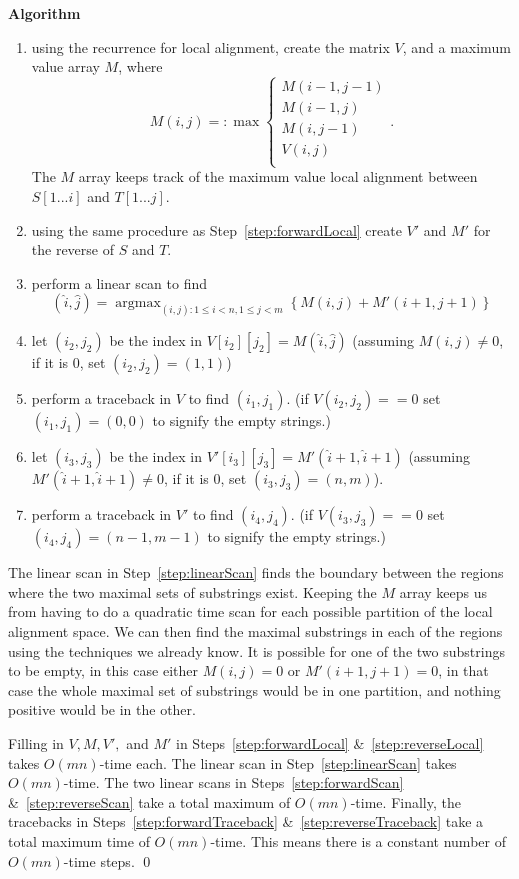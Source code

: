\documentclass[11pt, oneside]{article}   	%
\DeclareMathOperator*{\argmax}{argmax}
\begin{document}
\begin{enumerate}
\textbf{Algorithm}
\begin{enumerate}
\item using the recurrence for local alignment, create the matrix $V$, and a maximum value array $M$, where 
\[
M(i,j) =: \max \begin{cases}
M(i-1,j-1)\\
M(i-1,j)\\
M(i,j-1)\\
V(i,j)\\
\end{cases}.
\]
The $M$ array keeps track of the maximum value local alignment between $S[1...i]$ and $T[1...j]$. \label{step:forwardLocal}
\item using the same procedure as Step~\ref{step:forwardLocal} create $V'$ and $M'$ for the reverse of $S$ and $T$. \label{step:reverseLocal}
\item perform a linear scan to find 
\[
(\hat{i},\hat{j}) = \argmax_{(i,j): 1 \le i < n, 1 \le j < m} \left\{M(i,j) + M'(i+1,j+1)\right\}
\] \label{step:linearScan}
\item let $(i_2,j_2)$ be the index in $V[i_2][j_2] = M(\hat{i},\hat{j})$ (assuming $M(i,j) \ne 0$, if it is $0$, set $(i_2,j_2) = (1,1)$)\label{step:forwardScan}
\item perform a traceback in $V$ to find $(i_1, j_1)$. (if $V(i_2,j_2) == 0$ set $(i_1,j_1) = (0,0)$ to signify the empty strings.) \label{step:forwardTraceback}
\item let $(i_3, j_3)$ be the index in $V'[i_3][j_3] = M'(\hat{i}+1,\hat{i}+1)$ (assuming $M'(\hat{i}+1,\hat{i}+1) \ne 0$, if it is $0$, set $(i_3,j_3) = (n,m)$).\label{step:reverseScan}
\item perform a traceback in $V'$ to find $(i_4,j_4)$. (if $V(i_3,j_3) == 0$ set $(i_4,j_4) = (n-1, m-1)$ to signify the empty strings.)\label{step:reverseTraceback}
\end{enumerate}

The linear scan in Step~\ref{step:linearScan} finds the boundary between the regions where the two maximal sets of substrings exist. 
Keeping the $M$ array keeps us from having to do a quadratic time scan for each possible partition of the local alignment space. 
We can then find the maximal substrings in each of the regions using the techniques we already know.
It is possible for one of the two substrings to be empty, in this case either $M(i,j) = 0$ or $M'(i+1,j+1)=0$, 
in that case the whole maximal set of substrings would be in one partition, and nothing positive would be in the other. 

Filling in $V, M, V', $ and $M'$ in Steps~\ref{step:forwardLocal} \&~\ref{step:reverseLocal} takes $O(mn)$-time each. 
The linear scan in Step~\ref{step:linearScan} takes $O(mn)$-time.
 The two linear scans in Steps~\ref{step:forwardScan} \&~\ref{step:reverseScan} take a total maximum of $O(mn)$-time. 
 Finally, the tracebacks in Steps~\ref{step:forwardTraceback} \&~\ref{step:reverseTraceback} take a total maximum time of $O(mn)$-time. 
This means there is a constant number of $O(mn)$-time steps. \qed

\end{enumerate}
\end{document}
